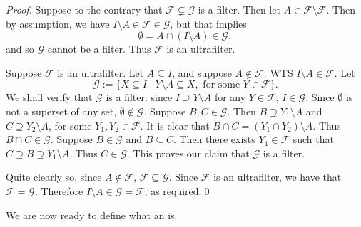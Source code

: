 \documentclass[notoc,notitlepage]{tufte-book}
\begin{document}
\begin{proof}
  \hlbnoted{$(\impliedby)$} Suppose to the contrary that $\mathcal{F} \subsetneq \mathcal{G}$ is a filter. Then let $A \in \mathcal{F} \setminus \mathcal{F}$. Then by assumption, we have $I \setminus A \in \mathcal{F} \in \mathcal{G}$, but that implies
  \begin{equation*}
    \emptyset = A \cap (I \setminus A) \in \mathcal{G},
  \end{equation*}
  and so $\mathcal{G}$ cannot be a filter. Thus $\mathcal{F}$ is an ultrafilter.

  \noindent\hlbnoted{$(\implies)$} Suppose $\mathcal{F}$ is an ultrafilter. Let $A \subseteq I$, and suppose $A \notin \mathcal{F}$. WTS $I \setminus A \in \mathcal{F}$. Let
  \begin{equation*}
    \mathcal{G} := \{ X \subseteq I \mid Y \setminus A \subseteq X, \text{ for some } Y \in \mathcal{F} \}.
  \end{equation*}
  We shall verify that $\mathcal{G}$ is a filter: since $I \supseteq Y \setminus A$ for any $Y \in \mathcal{F}$, $I \in \mathcal{G}$. Since $\emptyset$ is not a superset of any set, $\emptyset \notin \mathcal{G}$. Suppose $B, C \in \mathcal{G}$. Then $B \supseteq Y_1 \setminus A$ and $C \supseteq Y_2 \setminus A$, for some $Y_1, Y_2 \in \mathcal{F}$. It is clear that $B \cap C = (Y_1 \cap Y_2) \setminus A$. Thus $B \cap C \in \mathcal{G}$. Suppose $B \in \mathcal{G}$ and $B \subseteq C$. Then there exists $Y_1 \in \mathcal{F}$ such that $C \supseteq B \supseteq Y_1 \setminus A$. Thus $C \in \mathcal{G}$. This proves our claim that $\mathcal{G}$ is a filter.

  Quite clearly so, since $A \notin \mathcal{F}$, $\mathcal{F} \subseteq \mathcal{G}$. Since $\mathcal{F}$ is an ultrafilter, we have that $\mathcal{F} = \mathcal{G}$. Therefore $I \setminus A \in \mathcal{G} = \mathcal{F}$, as required.\qed\
\end{proof}

We are now ready to define what an  is.
\end{document}
